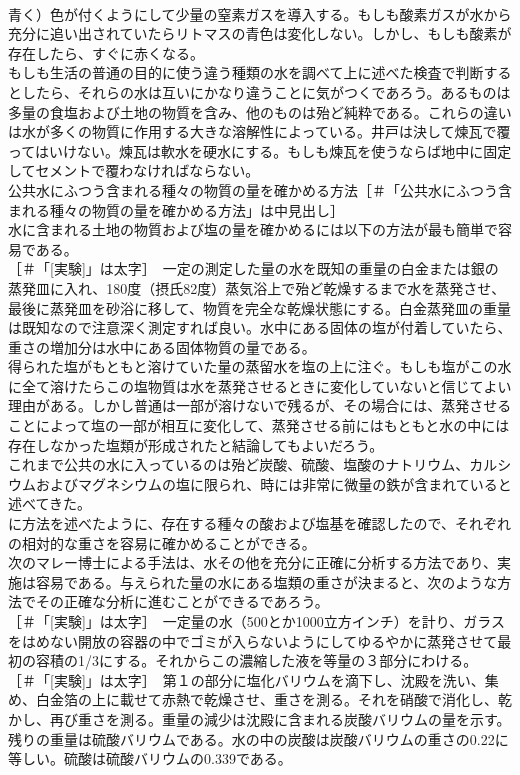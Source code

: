 \documentclass[8pt]{extreport}
\begin{document}
\begin{CJK}{UTF8}{min}
\\	青く）色が付くようにして少量の窒素ガスを導入する。もしも酸素ガスが水から充分に追い出されていたらリトマスの青色は変化しない。しかし、もしも酸素が存在したら、すぐに赤くなる。
\\	もしも生活の普通の目的に使う違う種類の水を調べて上に述べた検査で判断するとしたら、それらの水は互いにかなり違うことに気がつくであろう。あるものは多量の食塩および土地の物質を含み、他のものは殆ど純粋である。これらの違いは水が多くの物質に作用する大きな溶解性によっている。井戸は決して煉瓦で覆ってはいけない。煉瓦は軟水を硬水にする。もしも煉瓦を使うならば地中に固定してセメントで覆わなければならない。
\\	公共水にふつう含まれる種々の物質の量を確かめる方法［＃「公共水にふつう含まれる種々の物質の量を確かめる方法」は中見出し］
\\	水に含まれる土地の物質および塩の量を確かめるには以下の方法が最も簡単で容易である。
\\	[実験]［＃「[実験]」は太字］　一定の測定した量の水を既知の重量の白金または銀の蒸発皿に入れ、180度（摂氏82度）蒸気浴上で殆ど乾燥するまで水を蒸発させ、最後に蒸発皿を砂浴に移して、物質を完全な乾燥状態にする。白金蒸発皿の重量は既知なので注意深く測定すれば良い。水中にある固体の塩が付着していたら、重さの増加分は水中にある固体物質の量である。
\\	得られた塩がもともと溶けていた量の蒸留水を塩の上に注ぐ。もしも塩がこの水に全て溶けたらこの塩物質は水を蒸発させるときに変化していないと信じてよい理由がある。しかし普通は一部が溶けないで残るが、その場合には、蒸発させることによって塩の一部が相互に変化して、蒸発させる前にはもともと水の中には存在しなかった塩類が形成されたと結論してもよいだろう。
\\	これまで公共の水に入っているのは殆ど炭酸、硫酸、塩酸のナトリウム、カルシウムおよびマグネシウムの塩に限られ、時には非常に微量の鉄が含まれていると述べてきた。
\\	に方法を述べたように、存在する種々の酸および塩基を確認したので、それぞれの相対的な重さを容易に確かめることができる。
\\	次のマレー博士による手法は、水その他を充分に正確に分析する方法であり、実施は容易である。与えられた量の水にある塩類の重さが決まると、次のような方法でその正確な分析に進むことができるであろう。
\\	[実験]［＃「[実験]」は太字］　一定量の水（500とか1000立方インチ）を計り、ガラスをはめない開放の容器の中でゴミが入らないようにしてゆるやかに蒸発させて最初の容積の1/3にする。それからこの濃縮した液を等量の３部分にわける。
\\	[実験]［＃「[実験]」は太字］　第１の部分に塩化バリウムを滴下し、沈殿を洗い、集め、白金箔の上に載せて赤熱で乾燥させ、重さを測る。それを硝酸で消化し、乾かし、再び重さを測る。重量の減少は沈殿に含まれる炭酸バリウムの量を示す。残りの重量は硫酸バリウムである。水の中の炭酸は炭酸バリウムの重さの0.22に等しい。硫酸は硫酸バリウムの0.339である。

\end{CJK}
\end{document}
